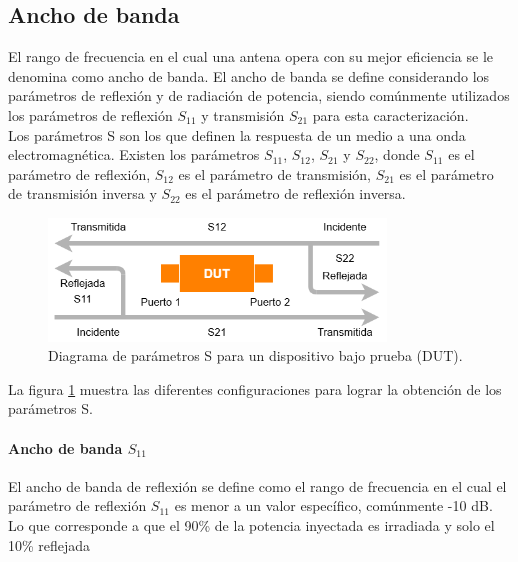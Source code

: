 \subsection{Ancho de banda}

El rango de frecuencia en el cual una antena opera con su mejor eficiencia se le denomina como ancho de banda. El ancho de banda se define considerando los parámetros de reflexión y de radiación de potencia, siendo comúnmente utilizados los parámetros de reflexión $S_{11}$ y transmisión $S_{21}$ para esta caracterización.\\

Los parámetros S son los que definen la respuesta de un medio a una onda electromagnética. Existen los parámetros $S_{11}$, $S_{12}$, $S_{21}$ y $S_{22}$, donde $S_{11}$ es el parámetro de reflexión, $S_{12}$ es el parámetro de transmisión, $S_{21}$ es el parámetro de transmisión inversa y $S_{22}$ es el parámetro de reflexión inversa.\\

\begin{figure}
    \centering
    \includegraphics[width = 0.8\textwidth]{img/bloquesS.png}
    \caption{Diagrama de parámetros S para un dispositivo bajo prueba (DUT).}
    \label{fig:sparam}
\end{figure}

La figura \ref{fig:sparam} muestra las diferentes configuraciones para lograr la obtención de los parámetros S.\\

\paragraph{Ancho de banda $S_{11}$} El ancho de banda de reflexión se define como el rango de frecuencia en el cual el parámetro de reflexión $S_{11}$ es menor a un valor específico, comúnmente -10 dB. Lo que corresponde a que el 90\% de la potencia inyectada es irradiada y solo el 10\% reflejada\\

